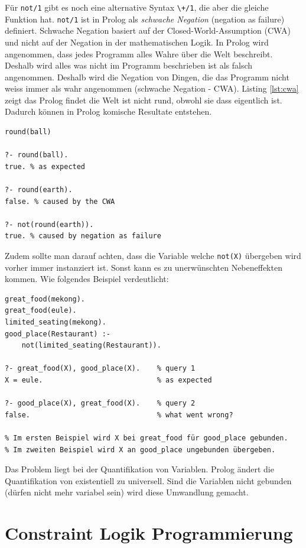 Für \verb|not/1| gibt es noch eine alternative Syntax \verb|\+/1|, die aber die gleiche Funktion hat. \verb|not/1| ist in Prolog als \textit{schwache Negation} (negation as failure) definiert. Schwache Negation basiert auf der Closed-World-Assumption (CWA) und nicht auf der Negation in der mathematischen Logik. In Prolog wird angenommen, dass jedes Programm alles Wahre über die Welt beschreibt. Deshalb wird alles was nicht im Programm beschrieben ist als falsch angenommen. Deshalb wird die Negation von Dingen, die das Programm nicht weiss immer als wahr angenommen (schwache Negation - CWA). Listing \ref{lst:cwa} zeigt das Prolog findet die Welt ist nicht rund, obwohl sie dass eigentlich ist. Dadurch können in Prolog komische Resultate entstehen.

\begin{lstlisting}[caption=CWA, label=lst:cwa]
round(ball)

?- round(ball).
true. % as expected

?- round(earth).
false. % caused by the CWA

?- not(round(earth)).
true. % caused by negation as failure
\end{lstlisting}

Zudem sollte man darauf achten, dass die Variable welche \verb|not(X)| übergeben wird vorher immer instanziert ist. Sonst kann es zu unerwünschten Nebeneffekten kommen. Wie folgendes Beispiel verdeutlicht:

\begin{lstlisting}[caption=Not muss gebunden sein]
great_food(mekong).
great_food(eule).
limited_seating(mekong).
good_place(Restaurant) :-
	not(limited_seating(Restaurant)).
	
?- great_food(X), good_place(X). 	% query 1
X = eule. 							% as expected

?- good_place(X), great_food(X). 	% query 2
false. 								% what went wrong?

% Im ersten Beispiel wird X bei great_food für good_place gebunden.
% Im zweiten Beispiel wird X an good_place ungebunden übergeben.
\end{lstlisting}

Das Problem liegt bei der Quantifikation von Variablen. Prolog ändert die Quantifikation von existentiell zu universell. Sind die Variablen nicht gebunden (dürfen nicht mehr variabel sein) wird diese Umwandlung gemacht.

\section{Constraint Logik Programmierung}

